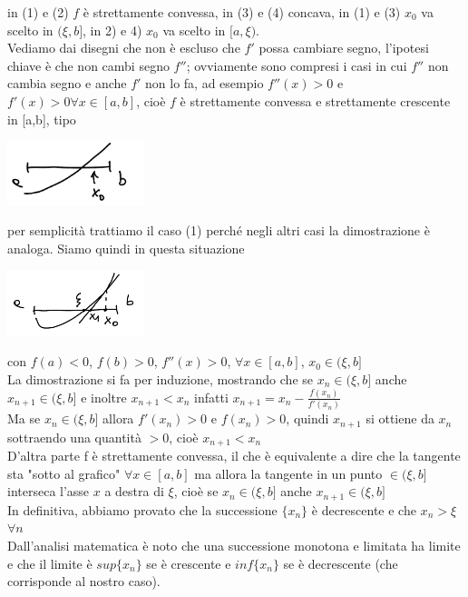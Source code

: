 \documentclass[12pt]{article}
\begin{document}
in (1) e (2) $f$ è strettamente convessa, in (3) e (4) concava, in (1) e (3) $x_0$ va scelto in $(\xi,b]$, in 2) e 4) $x_0 $ va scelto in $[a,\xi)$.\\
Vediamo dai disegni che non è escluso che $f'$ possa cambiare segno, l'ipotesi chiave è che non cambi segno $f''$; ovviamente sono compresi i casi in cui $f''$ non cambia segno e anche $f'$ non lo fa, ad esempio $f''(x) > 0$ e $f'(x) > 0 \forall x \in [a,b]$, cioè $f$ è strettamente convessa e strettamente crescente in [a,b], tipo\\
\begin{center}
\includegraphics[width=0.3\textwidth]{pagina12_1.PNG}
\end{center}
per semplicità trattiamo il caso (1) perché negli altri casi la dimostrazione è analoga. Siamo quindi in questa situazione\\
\begin{center}
\includegraphics[width=0.3\textwidth]{pagina12_2.PNG}
\end{center}
con $f(a) < 0$, $f(b) > 0$, $f''(x) > 0$, $\forall x \in [a,b]$, $x_0 \in (\xi,b]$\\
La dimostrazione si fa per induzione, mostrando che se $x_n \in (\xi, b]$ anche $x_{n+1} \in (\xi, b]$ e inoltre $x_{n+1} < x_n$ infatti $x_{n+1} = x_n - \frac{f(x_n)}{f'(x_n)}$\\
Ma se $x_n \in (\xi, b]$ allora $f'(x_n) > 0$ e $f(x_n) > 0$, quindi $x_{n+1}$ si ottiene da $x_n$ sottraendo una quantità $> 0$, cioè $x_{n+1} < x_n$\\
D'altra parte f è strettamente convessa, il che è equivalente a dire che la tangente sta "sotto al grafico" $\forall x \in [a,b]$ ma allora la tangente in un punto $\in (\xi, b]$ interseca l'asse $x$ a destra di $\xi$, cioè se $x_n \in (\xi, b]$ anche $x_{n+1} \in (\xi, b]$\\
In definitiva, abbiamo provato che la successione $\{x_n\}$ è decrescente e che $x_n > \xi$ $\forall n$\\
Dall'analisi matematica è noto che una successione monotona e limitata ha limite e che il limite è $sup\{x_n\}$ se è crescente e $inf\{x_n\}$ se è decrescente (che corrisponde al nostro caso). \\
\end{document}

